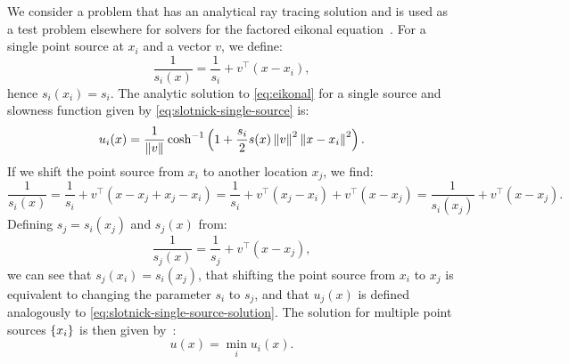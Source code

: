 \documentclass[sisc-eikonal.tex]{subfiles}
\begin{document}
We consider a problem that has an analytical ray tracing solution and
is used as a test problem elsewhere for solvers for the factored
eikonal
equation~\cite{slotnick1959lessons,fomel2009fast,qi2018corner}. For a
single point source at $x_i$ and a vector $v$, we define:
\begin{equation}
  \label{eq:slotnick-single-source}
  \frac{1}{s_i(x)} = \frac{1}{s_i} + v^\top {(x - x_i)},
\end{equation}
hence $s_i(x_i) = s_i$. The analytic solution to \cref{eq:eikonal} for a
single source and slowness function given by
\cref{eq:slotnick-single-source} is:
\begin{equation}
  \label{eq:slotnick-single-source-solution}
  u_i(x) = \frac{1}{\norm{v}} \cosh^{-1} \parens{1 + \frac{s_i}{2} s(x) \norm{v}^2 \norm{x - x_i}^2}.
\end{equation}
If we shift the point source from $x_i$ to another location $x_j$, we
find:
\begin{equation}
  \label{eq:slotnick-slowness-shift}
  \frac{1}{s_i(x)} = \frac{1}{s_i} + v^\top {(x - x_j + x_j - x_i)} = \frac{1}{s_i} + v^\top {(x_j - x_i)} + v^\top {(x - x_j)} = \frac{1}{s_i(x_j)} + v^\top {(x - x_j)}.
\end{equation}
Defining $s_j = s_i(x_j)$ and $s_j(x)$ from:
\begin{equation}
  \frac{1}{s_j(x)} = \frac{1}{s_j} + v^\top {(x - x_j)},
\end{equation}
we can see that $s_j(x_i) = s_i(x_j)$, that shifting the point source
from $x_i$ to $x_j$ is equivalent to changing the parameter $s_i$ to
$s_j$, and that $u_j(x)$ is defined analogously to
\cref{eq:slotnick-single-source-solution}. The solution for multiple
point sources $\left\{x_i\right\}$ is then given
by~\cite{fomel2009fast,qi2018corner}:
\begin{equation}
  u(x) = \min_i u_i(x).
\end{equation}
\end{document}
